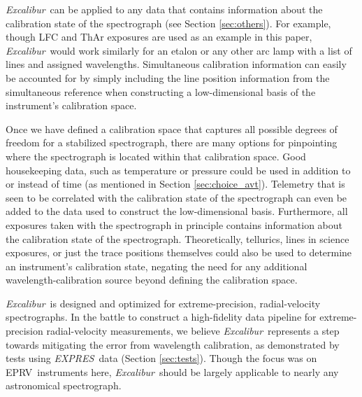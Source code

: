 \documentclass[modern]{aastex63}
\newcommand{\project}[1]{\textsl{#1}}
\newcommand{\name}{\project{Excalibur}}
\newcommand{\acronym}[1]{{\small{#1}}}
\newcommand{\expres}{\project{\acronym{EXPRES}}}
\newcommand{\eprv}{\acronym{EPRV}}
\begin{document}
\name\ can be applied to any data that contains information about the calibration state of the spectrograph (see Section \ref{sec:others}).  For example, though LFC and ThAr exposures are used as an example in this paper, \name\ would work similarly for an etalon or any other arc lamp with a list of lines and assigned wavelengths.  Simultaneous calibration information can easily be accounted for by simply including the line position information from the simultaneous reference when constructing a low-dimensional basis of the instrument's calibration space.

Once we have defined a calibration space that captures all possible degrees of freedom for a stabilized spectrograph, there are many options for pinpointing where the spectrograph is located within that calibration space.  Good housekeeping data, such as temperature or pressure could be used in addition to or instead of time (as mentioned in Section \ref{sec:choice_avt}).  Telemetry that is seen to be correlated with the calibration state of the spectrograph can even be added to the data used to construct the low-dimensional basis.  Furthermore, all exposures taken with the spectrograph in principle contains information about the calibration state of the spectrograph.  Theoretically, tellurics, lines in science exposures, or just the trace positions themselves could also be used to determine an instrument's calibration state, negating the need for any additional wavelength-calibration source beyond defining the calibration space.

\name\ is designed and optimized for extreme-precision, radial-velocity spectrographs.  In the battle to construct a high-fidelity data pipeline for extreme-precision radial-velocity measurements, we believe \name\ represents a step towards mitigating the error from wavelength calibration, as demonstrated by tests using \expres\ data (Section \ref{sec:tests}).  Though the focus was on \eprv\ instruments here, \name\ should be largely applicable to nearly any astronomical spectrograph.


\end{document}
